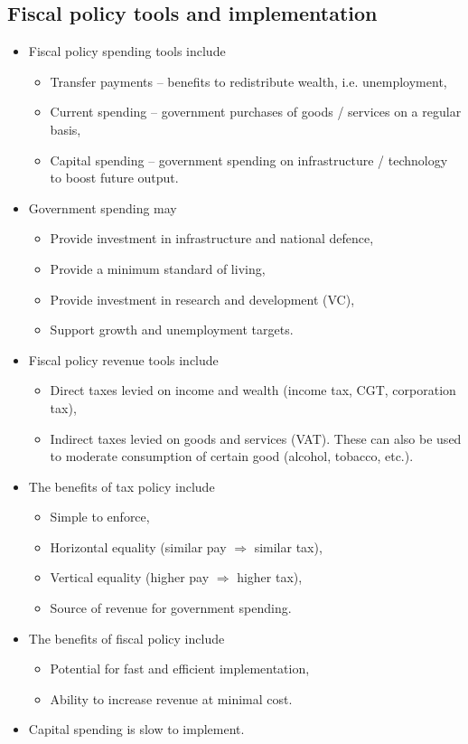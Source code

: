 \documentclass[../notes_compiled.tex]{subfiles}
\begin{document}
\subsection{Fiscal policy tools and implementation}
\begin{itemize}
\item Fiscal policy spending tools include
\begin{itemize}
\item Transfer payments -- benefits to redistribute wealth, i.e. unemployment,
\item Current spending -- government purchases of goods / services on a regular basis,
\item Capital spending -- government spending on infrastructure / technology to boost future output.
\end{itemize}

\item Government spending may
\begin{itemize}
\item Provide investment in infrastructure and national defence,
\item Provide a minimum standard of living,
\item Provide investment in research and development (VC),
\item Support growth and unemployment targets.
\end{itemize}

\item Fiscal policy revenue tools include
\begin{itemize}
\item Direct taxes levied on income and wealth (income tax, CGT, corporation tax),
\item Indirect taxes levied on goods and services (VAT). These can also be used to moderate consumption of certain good (alcohol, tobacco, etc.).
\end{itemize}

\item The benefits of tax policy include
\begin{itemize}
\item Simple to enforce,
\item Horizontal equality (similar pay $\Rightarrow$ similar tax),
\item Vertical equality (higher pay $\Rightarrow$ higher tax),
\item Source of revenue for government spending.
\end{itemize}

\item The benefits of fiscal policy include
\begin{itemize}
\item Potential for fast and efficient implementation, 
\item Ability to increase revenue at minimal cost.
\end{itemize}

\item Capital spending is slow to implement.
\end{itemize}
\end{document}
